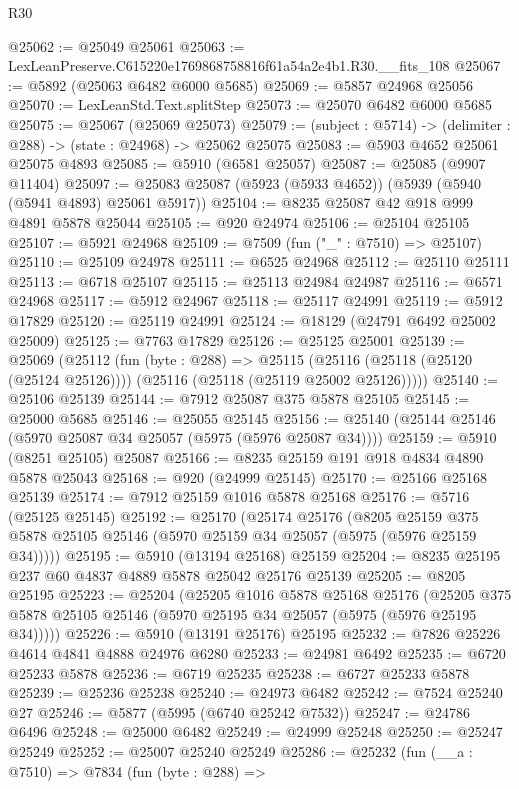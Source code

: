 \begin{lexlean}{R30}
\begin{coremodule}
@25062 := @25049 @25061
@25063 := LexLeanPreserve.C615220e1769868758816f61a54a2e4b1.R30.__fits_108
@25067 := @5892 (@25063 @6482 @6000 @5685)
@25069 := @5857 @24968 @25056
@25070 := LexLeanStd.Text.splitStep
@25073 := @25070 @6482 @6000 @5685
@25075 := @25067 (@25069 @25073)
@25079 := (subject : @5714) -> (delimiter : @288) -> (state : @24968) -> @25062 @25075
@25083 := @5903 @4652 @25061 @25075 @4893
@25085 := @5910 (@6581 @25057)
@25087 := @25085 (@9907 @11404)
@25097 := @25083 @25087 (@5923 (@5933 @4652)) (@5939 (@5940 (@5941 @4893) @25061 @5917))
@25104 := @8235 @25087 @42 @918 @999 @4891 @5878 @25044
@25105 := @920 @24974
@25106 := @25104 @25105
@25107 := @5921 @24968
@25109 := @7509 (fun ("_" : @7510) => @25107)
@25110 := @25109 @24978
@25111 := @6525 @24968
@25112 := @25110 @25111
@25113 := @6718 @25107
@25115 := @25113 @24984 @24987
@25116 := @6571 @24968
@25117 := @5912 @24967
@25118 := @25117 @24991
@25119 := @5912 @17829
@25120 := @25119 @24991
@25124 := @18129 (@24791 @6492 @25002 @25009)
@25125 := @7763 @17829
@25126 := @25125 @25001
@25139 := @25069
    (@25112
      (fun (byte : @288) =>
      @25115 (@25116 (@25118 (@25120 (@25124 @25126)))) (@25116 (@25118 (@25119 @25002 @25126)))))
@25140 := @25106 @25139
@25144 := @7912 @25087 @375 @5878 @25105
@25145 := @25000 @5685
@25146 := @25055 @25145
@25156 := @25140 (@25144 @25146 (@5970 @25087 @34 @25057 (@5975 (@5976 @25087 @34))))
@25159 := @5910 (@8251 @25105) @25087
@25166 := @8235 @25159 @191 @918 @4834 @4890 @5878 @25043
@25168 := @920 (@24999 @25145)
@25170 := @25166 @25168 @25139
@25174 := @7912 @25159 @1016 @5878 @25168
@25176 := @5716 (@25125 @25145)
@25192 := @25170
    (@25174
      @25176
      (@8205 @25159 @375 @5878 @25105 @25146 (@5970 @25159 @34 @25057 (@5975 (@5976 @25159 @34)))))
@25195 := @5910 (@13194 @25168) @25159
@25204 := @8235 @25195 @237 @60 @4837 @4889 @5878 @25042 @25176 @25139
@25205 := @8205 @25195
@25223 := @25204
    (@25205
      @1016
      @5878
      @25168
      @25176
      (@25205 @375 @5878 @25105 @25146 (@5970 @25195 @34 @25057 (@5975 (@5976 @25195 @34)))))
@25226 := @5910 (@13191 @25176) @25195
@25232 := @7826 @25226 @4614 @4841 @4888 @24976 @6280
@25233 := @24981 @6492
@25235 := @6720 @25233 @5878
@25236 := @6719 @25235
@25238 := @6727 @25233 @5878
@25239 := @25236 @25238
@25240 := @24973 @6482
@25242 := @7524 @25240 @27
@25246 := @5877 (@5995 (@6740 @25242 @7532))
@25247 := @24786 @6496
@25248 := @25000 @6482
@25249 := @24999 @25248
@25250 := @25247 @25249
@25252 := @25007 @25240 @25249
@25286 := @25232
    (fun (__a : @7510) =>
    @7834
      (fun (byte : @288) =>

\end{coremodule}
\end{lexlean}
